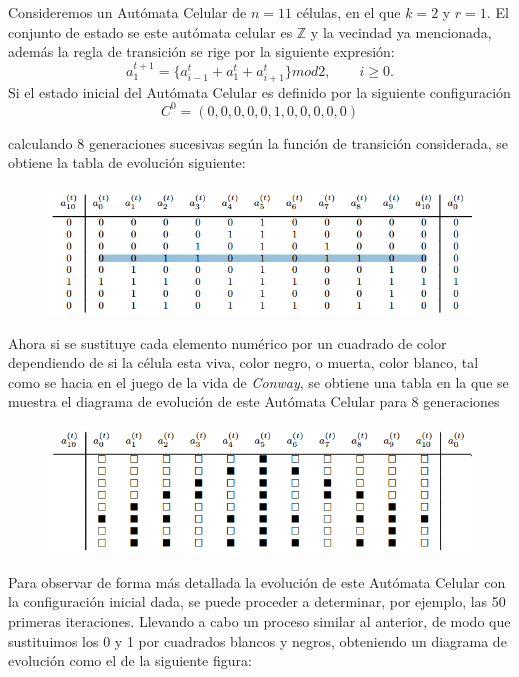 Consideremos un Autómata Celular de $n = 11$ células, en el que $k = 2$ y $r = 1$. El conjunto de estado se este autómata celular es $\mathbb{Z}$ y la vecindad ya mencionada, además la regla de transición se rige por la siguiente expresión:
$$a_1^{t+1} = \lbrace a_{i-1}^t + a_{1}^t +a_{i+1}^t \rbrace mod 2, \qquad i \geq 0.  $$
Si el estado inicial del Autómata Celular es definido por la siguiente configuración
$$C^0 = (0,0,0,0,0,1,0,0,0,0,0)$$

calculando 8 generaciones sucesivas según la función de transición considerada, se obtiene la tabla de evolución siguiente:

\begin{figure}[H]
\centering
\includegraphics[scale=0.7]{imagenes/ejemplo_1.png}
\end{figure}

Ahora si se sustituye cada elemento numérico por un cuadrado de color dependiendo de si la célula esta viva, color negro, o muerta, color blanco, tal como se hacia en el juego de la vida de \textit{Conway}, se obtiene una tabla en la que se muestra el diagrama de evolución de este Autómata Celular para 8 generaciones

\begin{figure}[H]
\centering
\includegraphics[scale=0.7]{imagenes/ejemplo_2.png}
\end{figure}

Para observar de forma más detallada la evolución de este Autómata Celular con la configuración inicial dada, se puede proceder a determinar, por ejemplo, las 50 primeras iteraciones. Llevando a cabo un proceso similar al anterior, de modo que sustituimos los 0 y 1 por cuadrados blancos y negros, obteniendo un diagrama de evolución como el de la siguiente figura:
 
